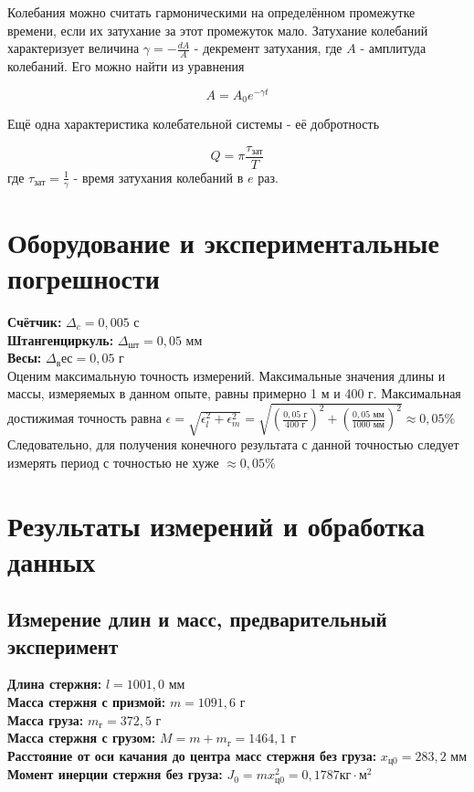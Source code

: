 \documentclass[a4paper,12pt]{article} %
\begin{document}
Колебания можно считать гармоническими на определённом промежутке времени, если их затухание за этот промежуток мало. Затухание колебаний характеризует величина $ \gamma = -\frac{dA}{A}$ - декремент затухания, где $ A $ - амплитуда колебаний. Его можно найти из уравнения

\begin{equation}
    A=A_0e^{-\gamma t}
\label{decrement}
\end{equation}

Ещё одна характеристика колебательной системы - её добротность

\begin{equation}
    Q=\pi\frac{\tau_\text{зат}}{T}
\end{equation}
где $ \tau_\text{зат}=\frac{1}{\gamma}$ - время затухания колебаний в $ e $ раз.

\section{Оборудование и экспериментальные погрешности}

\textbf{Счётчик:} $ \Delta_c = 0,005 \text{ с}$\\
\textbf{Штангенциркуль:} $ \Delta_\text{шт} = 0,05 \text{ мм}$\\
\textbf{Весы:} $ \Delta_вес = 0,05 \text{ г}$ \\
Оценим максимальную точность измерений. Максимальные значения длины и массы, измеряемых в данном опыте, равны примерно 1 м и 400 г. Максимальная достижимая точность равна $ \epsilon = \sqrt{\epsilon_l^2+\epsilon_m^2} = \sqrt{(\frac{0,05 \text{ г}}{400 \text{ г}})^2+(\frac{0,05 \text{ мм}}{1000 \text{ мм}})^2}\approx 0,05\% $ Следовательно, для получения конечного результата с данной точностью следует измерять период с точностью не хуже $\approx 0,05\%$

\section{Результаты измерений и обработка данных}

\subsection{Измерение длин и масс, предварительный эксперимент}

\textbf{Длина стержня:} $ l = 1001,0 \text{ мм}$\\
\textbf{Масса стержня с призмой:} $ m = 1091,6 \text{ г}$\\
\textbf{Масса груза:} $ m_\text{г} = 372,5 \text{ г}$\\
\textbf{Масса стержня с грузом:} $ M = m + m_\text{г} = 1464,1 \text{ г}$\\
\textbf{Расстояние от оси качания до центра масс стержня без груза:} $ x_\text{ц0} = 283,2 \text{ мм}$\\
\textbf{Момент инерции стержня без груза:} $ J_0 = mx_\text{ц0}^2 = 0,1787 \text{кг} \cdot \text{м}^2$
\end{document}
